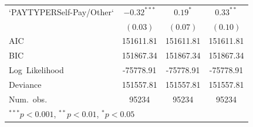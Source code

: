 \documentclass[12pt,twoside]{reedthesis}
\begin{document}
\begin{table}
\begin{center}
\begin{footnotesize}
\begin{tabular}{l c c c }
  `PAYTYPERSelf-Pay/Other` & $\mathbf{-0.32}^{***}$ & $0.19^{*}$             & $0.33^{**}$            \\
                           & $(0.03)$               & $(0.07)$               & $(0.10)$               \\
  \hline
  AIC                      & 151611.81              & 151611.81              & 151611.81              \\
  BIC                      & 151867.34              & 151867.34              & 151867.34              \\
  Log\ Likelihood          & -75778.91              & -75778.91              & -75778.91              \\
  Deviance                 & 151557.81              & 151557.81              & 151557.81              \\
  Num.\ obs.               & 95234                  & 95234                  & 95234                  \\
  \hline
  \multicolumn{4}{l}{\tiny{$^{***}p<0.001$, $^{**}p<0.01$, $^*p<0.05$}}
  \end{tabular}
  \end{footnotesize}
  \label{table:coefficients}
  \end{center}
  \end{table}
  
\end{document}
